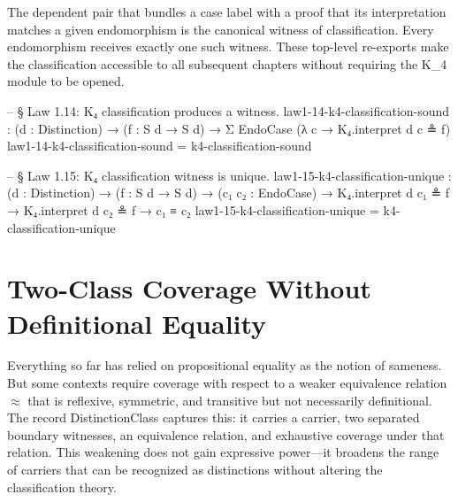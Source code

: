 \documentclass[11pt,a4paper]{book}
\def\texttt#1{#1}%
\def\ensuremath#1{#1}%
\begin{document}
The dependent pair that bundles a case label with a proof that its interpretation matches a given endomorphism is the canonical witness of classification. Every endomorphism receives exactly one such witness. These top-level re-exports make the classification accessible to all subsequent chapters without requiring the \texttt{K\ensuremath{_4}} module to be opened.

\begin{code}
-- § Law 1.14: K₄ classification produces a witness.
law1-14-k4-classification-sound :
  (d : Distinction) →
  (f : S d → S d) →
  Σ EndoCase (λ c → K₄.interpret d c ≗ f)
law1-14-k4-classification-sound = k4-classification-sound

-- § Law 1.15: K₄ classification witness is unique.
law1-15-k4-classification-unique :
  (d : Distinction) →
  (f : S d → S d) →
  (c₁ c₂ : EndoCase) →
  K₄.interpret d c₁ ≗ f →
  K₄.interpret d c₂ ≗ f →
  c₁ ≡ c₂
law1-15-k4-classification-unique = k4-classification-unique
\end{code}

\section{Two-Class Coverage Without Definitional Equality}

Everything so far has relied on propositional equality \texttt{\ensuremath{\equiv}} as the notion of sameness. But some contexts require coverage with respect to a weaker equivalence relation $\approx$ that is reflexive, symmetric, and transitive but not necessarily definitional. The record \texttt{DistinctionClass} captures this: it carries a carrier, two separated boundary witnesses, an equivalence relation, and exhaustive coverage under that relation. This weakening does not gain expressive power—it broadens the range of carriers that can be recognized as distinctions without altering the classification theory.
\end{document}
